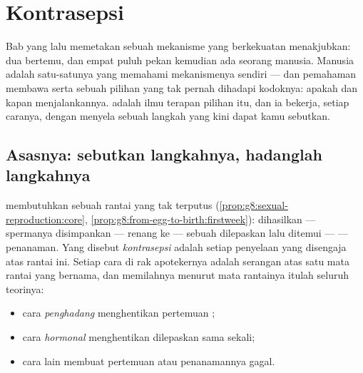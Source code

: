\chapter{Kontrasepsi}\label{ch:g8:contraception}

Bab yang lalu memetakan sebuah mekanisme yang berkekuatan
menakjubkan: dua  bertemu, dan empat puluh pekan kemudian
ada seorang manusia. Manusia adalah satu-satunya 
yang memahami mekanismenya sendiri --- dan pemahaman membawa
serta sebuah pilihan yang tak pernah dihadapi kodoknya:
apakah dan kapan menjalankannya. \emph{} adalah
ilmu terapan pilihan itu, dan ia bekerja, setiap caranya,
dengan menyela sebuah langkah yang kini dapat kamu sebutkan.

\section{Asasnya: sebutkan langkahnya, hadanglah langkahnya}

\begin{proposition}\label{prop:g8:contraception:principle}
 membutuhkan sebuah rantai yang tak terputus
(\cref{prop:g8:sexual-reproduction:core},
\cref{prop:g8:from-egg-to-birth:firstweek}): 
dihasilkan --- spermanya disimpankan --- renang ke  --- sebuah  dilepaskan lalu ditemui ---
 --- penanaman. Yang disebut
\emph{kontrasepsi} adalah setiap
penyelaan yang disengaja atas rantai ini. Setiap cara di rak
apotekernya adalah serangan atas satu mata rantai yang
bernama, dan memilahnya menurut mata rantainya itulah
seluruh teorinya:
\begin{itemize}
  \item cara \emph{penghadang} menghentikan pertemuan ;
  \item cara \emph{hormonal} menghentikan 
        dilepaskan sama sekali;
  \item cara lain membuat pertemuan atau penanamannya
        gagal.
\end{itemize}
\end{proposition}
\admitted

